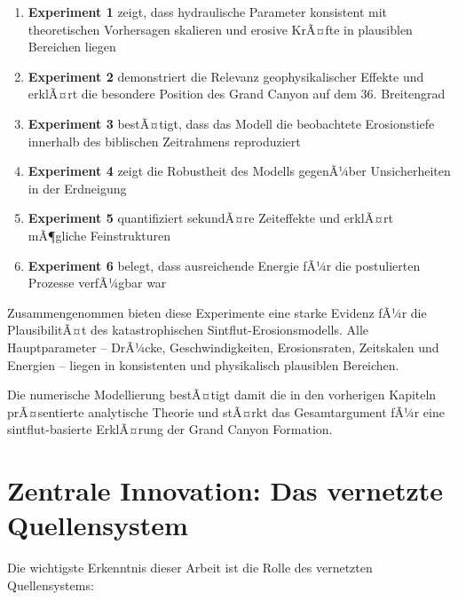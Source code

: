 ﻿\documentclass[12pt,a4paper]{report}
\begin{document}
\begin{enumerate}
	\item \textbf{Experiment 1} zeigt, dass hydraulische Parameter konsistent mit theoretischen Vorhersagen skalieren und erosive KrÃ¤fte in plausiblen Bereichen liegen
	
	\item \textbf{Experiment 2} demonstriert die Relevanz geophysikalischer Effekte und erklÃ¤rt die besondere Position des Grand Canyon auf dem 36. Breitengrad
	
	\item \textbf{Experiment 3} bestÃ¤tigt, dass das Modell die beobachtete Erosionstiefe innerhalb des biblischen Zeitrahmens reproduziert
	
	\item \textbf{Experiment 4} zeigt die Robustheit des Modells gegenÃ¼ber Unsicherheiten in der Erdneigung
	
	\item \textbf{Experiment 5} quantifiziert sekundÃ¤re Zeiteffekte und erklÃ¤rt mÃ¶gliche Feinstrukturen
	
	\item \textbf{Experiment 6} belegt, dass ausreichende Energie fÃ¼r die postulierten Prozesse verfÃ¼gbar war
\end{enumerate}

Zusammengenommen bieten diese Experimente eine starke Evidenz fÃ¼r die PlausibilitÃ¤t des katastrophischen Sintflut-Erosionsmodells. Alle Hauptparameter -- DrÃ¼cke, Geschwindigkeiten, Erosionsraten, Zeitskalen und Energien -- liegen in konsistenten und physikalisch plausiblen Bereichen.

Die numerische Modellierung bestÃ¤tigt damit die in den vorherigen Kapiteln prÃ¤sentier\-te analytische Theorie und stÃ¤rkt das Gesamtargument fÃ¼r eine sintflut-basierte ErklÃ¤rung der Grand Canyon Formation.

\section{Zentrale Innovation: Das vernetzte Quellensystem}

Die wichtigste Erkenntnis dieser Arbeit ist die Rolle des vernetzten Quellensystems:

\begin{center}
\end{center}
\end{document}
